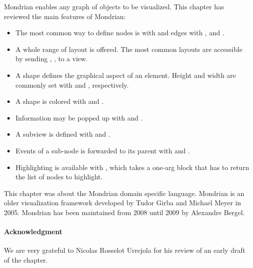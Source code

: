 \documentclass[a4paper,10pt,twoside]{book}
\begin{document}
Mondrian enables any graph of objects to be visualized. This chapter has reviewed the main features of Mondrian:
\begin{itemize}
\item The most common way to define nodes is with  and edges with ,  and .
\item A whole range of layout is offered. The most common layouts are accessible by sending , ,  to a view.
\item A shape defines the graphical aspect of an element. Height and width are commonly set with  and , respectively. 
\item A shape is colored with  and .
\item Information may be popped up with  and .
\item A subview is defined with  and .
\item Events of a sub-node is forwarded to its parent with  and .
\item Highlighting is available with , which takes a one-arg block that has to return the list of nodes to highlight.
\end{itemize}

This chapter was about the Mondrian domain specific language. 
Mondrian is an older visualization framework developed by Tudor Girba and Michael Meyer in 2005. Mondrian has been maintained from 2008 until 2009 by Alexandre Bergel. 


\paragraph{Acknowledgment}
We are very grateful to Nicolas Rosselot Urrejola for his review of an early draft of the chapter.

%
%


\ifx\wholebook\relax\else
   
   
\end{document}
